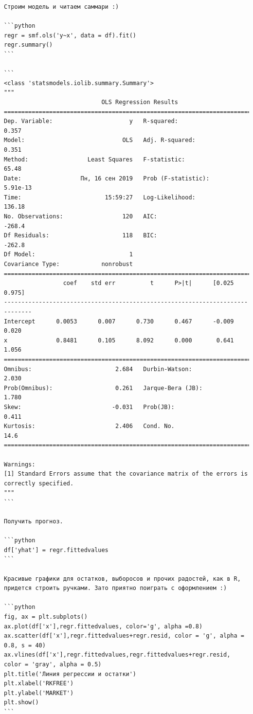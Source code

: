 \documentclass[]{book}
\begin{document}
\begin{verbatim}
Строим модель и читаем саммари :)

```python
regr = smf.ols('y~x', data = df).fit()
regr.summary()
```

```
<class 'statsmodels.iolib.summary.Summary'>
"""
                            OLS Regression Results                            
==============================================================================
Dep. Variable:                      y   R-squared:                       0.357
Model:                            OLS   Adj. R-squared:                  0.351
Method:                 Least Squares   F-statistic:                     65.48
Date:                 Пн, 16 сен 2019   Prob (F-statistic):           5.91e-13
Time:                        15:59:27   Log-Likelihood:                 136.18
No. Observations:                 120   AIC:                            -268.4
Df Residuals:                     118   BIC:                            -262.8
Df Model:                           1                                         
Covariance Type:            nonrobust                                         
==============================================================================
                 coef    std err          t      P>|t|      [0.025      0.975]
------------------------------------------------------------------------------
Intercept      0.0053      0.007      0.730      0.467      -0.009       0.020
x              0.8481      0.105      8.092      0.000       0.641       1.056
==============================================================================
Omnibus:                        2.684   Durbin-Watson:                   2.030
Prob(Omnibus):                  0.261   Jarque-Bera (JB):                1.780
Skew:                          -0.031   Prob(JB):                        0.411
Kurtosis:                       2.406   Cond. No.                         14.6
==============================================================================

Warnings:
[1] Standard Errors assume that the covariance matrix of the errors is correctly specified.
"""
```

Получить прогноз.

```python
df['yhat'] = regr.fittedvalues
```

Красивые графики для остатков, выборосов и прочих радостей, как в R, придется строить ручками. Зато приятно поиграть с оформлением :)

```python
fig, ax = plt.subplots()
ax.plot(df['x'],regr.fittedvalues, color='g', alpha =0.8)
ax.scatter(df['x'],regr.fittedvalues+regr.resid, color = 'g', alpha = 0.8, s = 40)
ax.vlines(df['x'],regr.fittedvalues,regr.fittedvalues+regr.resid, color = 'gray', alpha = 0.5)
plt.title('Линия регрессии и остатки')
plt.xlabel('RKFREE')
plt.ylabel('MARKET')
plt.show()
```


\end{verbatim}
\end{document}

